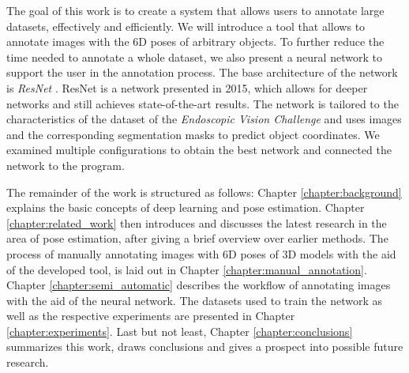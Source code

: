The goal of this work is to create a system that allows users to annotate large datasets, effectively and efficiently. We will introduce a tool that allows to annotate images with the 6D poses of arbitrary objects. To further reduce the time needed to annotate a whole dataset, we also present a neural network to support the user in the annotation process. The base architecture of the network is \textit{ResNet} \cite{resnet}. ResNet is a network presented in 2015, which allows for deeper networks and still achieves state-of-the-art results. The network is tailored to the characteristics of the dataset of the \textit{Endoscopic Vision Challenge} and uses images and the corresponding segmentation masks to predict object coordinates. We examined multiple configurations to obtain the best network and connected the network to the program.

The remainder of the work is structured as follows: Chapter \ref{chapter:background} explains the basic concepts of deep learning and pose estimation. Chapter \ref{chapter:related_work} then introduces and discusses the latest research in the area of pose estimation, after giving a brief overview over earlier methods. The process of manually annotating images with 6D poses of 3D models with the aid of the developed tool, is laid out in Chapter \ref{chapter:manual_annotation}. Chapter \ref{chapter:semi_automatic} describes the workflow of annotating images with the aid of the neural network. The datasets used to train the network as well as the respective experiments are presented in Chapter \ref{chapter:experiments}. Last but not least, Chapter \ref{chapter:conclusions} summarizes this work, draws conclusions and gives a prospect into possible future research.